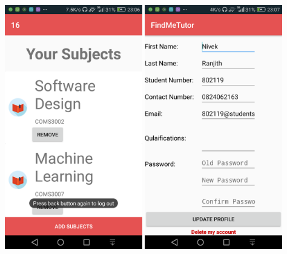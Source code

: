 \documentclass[12pt]{article}
\begin{document}
\begin{flushleft}
\includegraphics[width=60mm]{./Sprint3Models/Screenshots/subjects.png}
\includegraphics[width=60mm]{./Sprint3Models/Screenshots/updateprofile.png}
\end{flushleft}
\end{document}
